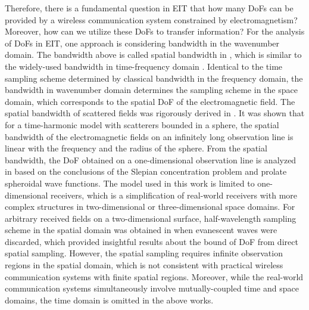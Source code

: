 \documentclass[12pt,draftclsnofoot,journal,onecolumn]{IEEEtran}
\begin{document}
Therefore, there is a fundamental question in EIT that how many DoFs can be provided by a wireless communication system constrained by electromagnetism? Moreover, how can we utilize these DoFs to transfer information? For the analysis of DoFs in EIT, one approach is considering bandwidth in the wavenumber domain.  The bandwidth above is called spatial bandwidth in \cite{bucci1987spatial}, which is similar to the widely-used bandwidth in time-frequency domain \cite{slepian1976bandwidth}. Identical to the time sampling scheme determined by classical bandwidth in the frequency domain, the bandwidth in wavenumber domain determines the sampling scheme in the space domain, which corresponds to the spatial DoF of the electromagnetic field. The spatial bandwidth of scattered fields was rigorously derived in \cite{bucci1987spatial}. It was shown that for a time-harmonic model with scatterers bounded in a sphere, the spatial bandwidth of the electromagnetic fields on an infinitely long observation line is linear with the frequency and the radius of the sphere. {\color{red} From the spatial bandwidth, the DoF obtained on a one-dimensional observation line is analyzed in \cite{bucci1989degrees} based on the conclusions of the Slepian concentration problem and prolate spheroidal wave functions. The model used in this work is limited to one-dimensional receivers, which is a simplification of real-world receivers with more complex structures in two-dimensional or three-dimensional space domains.} For arbitrary received fields on a two-dimensional surface, half-wavelength sampling scheme in the spatial domain was obtained in \cite{balanis2015antenna} when evanescent waves were discarded, which provided insightful results about the bound of DoF from direct spatial sampling. However, the spatial sampling requires infinite observation regions in the spatial domain, which is not consistent with practical wireless communication systems with finite spatial regions. {\color{red} Moreover, while the real-world communication systems simultaneously involve mutually-coupled time and space domains, the time domain is omitted in the above works.}
\end{document}
